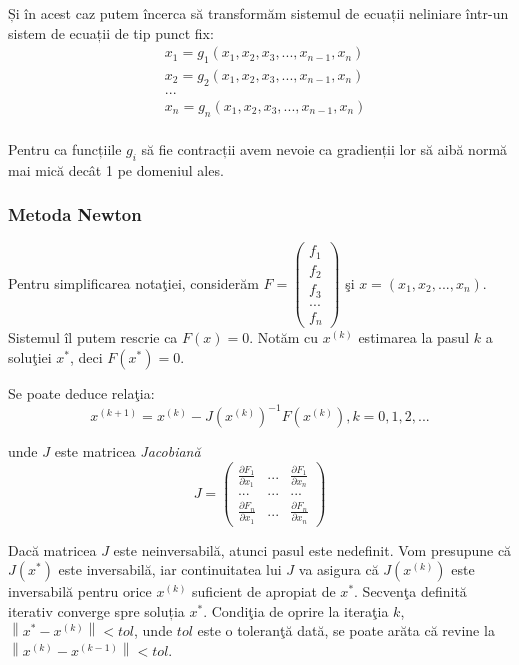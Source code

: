 \documentclass{exam}
\begin{document}
Și în acest caz putem încerca să transformăm sistemul de ecuații neliniare
într-un sistem de ecuații de tip punct fix:
\begin{align*}
	 & x_{1} = g_{1}(x_{1},x_{2},x_{3},...,x_{n-1},x_{n}) \\
	 & x_{2} = g_{2}(x_{1},x_{2},x_{3},...,x_{n-1},x_{n}) \\
	 & ...                                                \\
	 & x_{n} = g_{n}(x_{1},x_{2},x_{3},...,x_{n-1},x_{n}) \\
\end{align*}

Pentru ca funcțiile $g_{i}$ să fie contracții avem nevoie ca gradienții lor să
aibă normă mai mică decât 1 pe domeniul ales.

\subsubsection{Metoda Newton}

Pentru simplificarea notaţiei, considerăm
$F=\left(\begin{array}{c}f_{1}\\f_{2}\\f_{3}\\...\\f_{n} \end{array}\right)$ şi
$x=(x_{1},x_{2},...,x_{n})$. Sistemul îl putem rescrie ca $F(x)=0$.
Notăm cu $x^{(k)}$ estimarea la pasul $k$ a soluţiei $x^{*}$, deci $F(x^{*})=0$.

Se poate deduce relaţia:
$$x^{(k+1)} = x^{(k)} - J(x^{(k)})^{-1}F(x^{(k)}), k=0,1,2,... $$

\noindent  unde $J$ este matricea \textit{Jacobiană}
\[J=  \left( \begin{array}{ccc}
			\frac{\partial F_{1}}{ \partial x_{1}} & ...   & \frac{\partial F_{1}}{ \partial x_{n}} \\
			{...}                                  & {...} & {...}                                  \\
			\frac{\partial F_{n}}{ \partial x_{1}} & ...   & \frac{\partial F_{n}}{ \partial x_{n}}
		\end{array} \right)\]

Dacă matricea $J$ este neinversabilă, atunci pasul este nedefinit. Vom presupune că $J(x^*)$ este inversabilă, iar continuitatea lui $J$ va asigura că $J(x^{(k)})$ este inversabilă pentru orice $x^{(k)}$ suficient de apropiat de $x^*$.
Secvenţa definită iterativ converge spre soluția $x^*$.
Condiţia de oprire la iteraţia $k$, $\left \|x^{*}-x^{(k)}  \right \|<tol$, unde $tol$ este o toleranţă dată, se poate arăta că revine la $\left \|x^{(k)}-x^{(k-1)}  \right \|<tol.$
\end{document}
